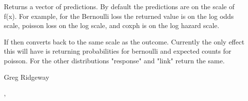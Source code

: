\documentclass{article}
\begin{document}
\begin{Value}
Returns a vector of predictions. By default the predictions are on the scale of f(x). For example, for the Bernoulli loss the returned value is on the log odds scale, poisson loss on the log scale, and coxph is on the log hazard scale.

If  then  converts back to the same scale as the outcome. Currently the only effect this will have is returning probabilities for bernoulli and expected counts for poisson. For the other distributions "response" and "link" return the same.
\end{Value}
\begin{Author}\relax
Greg Ridgeway 
\end{Author}
\begin{SeeAlso}\relax
{}, 
\end{SeeAlso}
\end{document}
